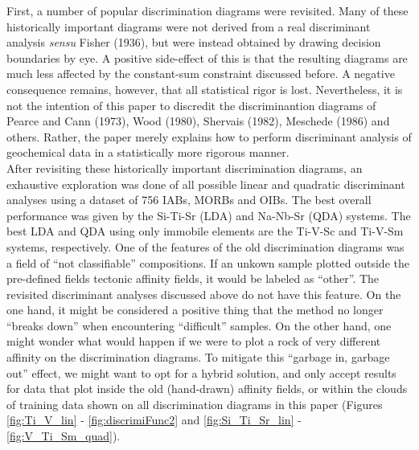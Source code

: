 \documentclass{article}
\begin{document}
First,  a number  of popular  discrimination diagrams  were revisited.
Many of these historically important  diagrams were not derived from a
real discriminant analysis {\it sensu} Fisher (1936), but were instead
obtained  by   drawing  decision   boundaries  by  eye.    A  positive
side-effect  of this  is that  the  resulting diagrams  are much  less
affected by  the constant-sum constraint discussed  before. A negative
consequence  remains, however,  that  all statistical  rigor is  lost.
Nevertheless, it is  not the intention of this  paper to discredit the
discriminantion  diagrams  of Pearce  and  Cann  (1973), Wood  (1980),
Shervais (1982), Meschede (1986) and others.  Rather, the paper merely
explains how to perform discriminant analysis of geochemical data in a
statistically more rigorous manner.\\

After revisiting these historically important discrimination diagrams,
an  exhaustive  exploration  was  done  of  all  possible  linear  and
quadratic discriminant analyses using a dataset of 756 IABs, MORBs and
OIBs.  The  best overall performance  was given by the  Si-Ti-Sr (LDA)
and Na-Nb-Sr (QDA)  systems. The best LDA and  QDA using only immobile
elements are the Ti-V-Sc and Ti-V-Sm systems, respectively. One of the
features  of the  old discrimination  diagrams  was a  field of  ``not
classifiable'' compositions.  If an  unkown sample plotted outside the
pre-defined fields  tectonic affinity fields,  it would be  labeled as
``other''. The revisited discriminant  analyses discussed above do not
have this feature.  On the one hand, it might be considered a positive
thing  that the  method no  longer ``breaks  down''  when encountering
``difficult'' samples.  On the other hand, one might wonder what would
happen if  we were to  plot a rock  of very different affinity  on the
discrimination diagrams. To mitigate  this ``garbage in, garbage out''
effect, we  might want to opt  for a hybrid solution,  and only accept
results  for  data that  plot  inside  the  old (hand-drawn)  affinity
fields,  or  within   the  clouds  of  training  data   shown  on  all
discrimination  diagrams in this  paper (Figures  \ref{fig:Ti_V_lin} -
\ref{fig:discrimiFunc2}       and       \ref{fig:Si_Ti_Sr_lin}       -
\ref{fig:V_Ti_Sm_quad}).\\
\end{document}
